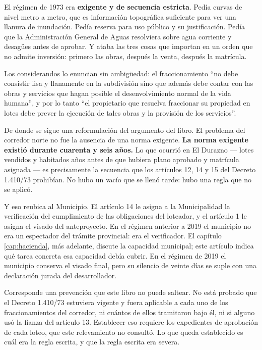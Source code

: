 \begin{cautela}
El régimen de 1973 era \textbf{exigente y de secuencia estricta}. Pedía curvas de nivel metro a metro, que es información topográfica suficiente para ver una llanura de inundación. Pedía reserva para uso público y su justificación. Pedía que la Administración General de Aguas resolviera sobre agua corriente y desagües antes de aprobar. Y ataba las tres cosas que importan en un orden que no admite inversión: primero las obras, después la venta, después la matrícula.

Los considerandos lo enuncian sin ambigüedad: el fraccionamiento ``no debe consistir lisa y llanamente en la subdivisión sino que además debe contar con las obras y servicios que hagan posible el desenvolvimiento normal de la vida humana'', y por lo tanto ``el propietario que resuelva fraccionar su propiedad en lotes debe prever la ejecución de tales obras y la provisión de los servicios''.
\end{cautela}

\begin{cautela}
De donde se sigue una reformulación del argumento del libro. El problema del corredor norte no fue la ausencia de una norma exigente. \textbf{La norma exigente existió durante cuarenta y seis años.} Lo que ocurrió en El Durazno --- lotes vendidos y habitados años antes de que hubiera plano aprobado y matrícula asignada --- es precisamente la secuencia que los artículos 12, 14 y 15 del Decreto 1.410/73 prohibían. No hubo un vacío que se llenó tarde: hubo una regla que no se aplicó.

Y eso reubica al Municipio. El artículo 14 le asigna a la Municipalidad la verificación del cumplimiento de las obligaciones del loteador, y el artículo 1 le asigna el visado del anteproyecto. En el régimen anterior a 2019 el municipio no era un espectador del trámite provincial: era el verificador. El capítulo \ref{cap:hacienda}, más adelante, discute la capacidad municipal; este artículo indica qué tarea concreta esa capacidad debía cubrir. En el régimen de 2019 el municipio conserva el visado final, pero su silencio de veinte días se suple con una declaración jurada del desarrollador.

Corresponde una prevención que este libro no puede saltear. No está probado que el Decreto 1.410/73 estuviera vigente y fuera aplicable a cada uno de los fraccionamientos del corredor, ni cuántos de ellos tramitaron bajo él, ni si alguno usó la fianza del artículo 13. Establecer eso requiere los expedientes de aprobación de cada loteo, que este relevamiento no consultó. Lo que queda establecido es cuál era la regla escrita, y que la regla escrita era severa.
\end{cautela}

